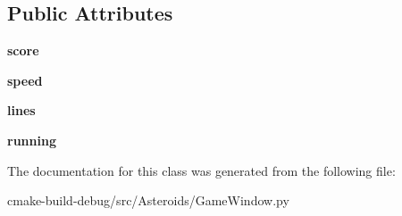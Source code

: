 \subsection*{Public Attributes}
\begin{DoxyCompactItemize}
\item 
{\bfseries score}\hypertarget{classGameWindow_1_1GameWindow_a1d84d147b6e32a9b135ebd2c25fa9de2}{}\label{classGameWindow_1_1GameWindow_a1d84d147b6e32a9b135ebd2c25fa9de2}

\item 
{\bfseries speed}\hypertarget{classGameWindow_1_1GameWindow_a65e5c68dfa1017d7d36c127dc91f7800}{}\label{classGameWindow_1_1GameWindow_a65e5c68dfa1017d7d36c127dc91f7800}

\item 
{\bfseries lines}\hypertarget{classGameWindow_1_1GameWindow_a5596975989f8091d3e6424c80eff1559}{}\label{classGameWindow_1_1GameWindow_a5596975989f8091d3e6424c80eff1559}

\item 
{\bfseries running}\hypertarget{classGameWindow_1_1GameWindow_a75c82f26a471a2bce7c30cc1ce450e85}{}\label{classGameWindow_1_1GameWindow_a75c82f26a471a2bce7c30cc1ce450e85}

\end{DoxyCompactItemize}


The documentation for this class was generated from the following file\+:\begin{DoxyCompactItemize}
\item 
cmake-\/build-\/debug/src/\+Asteroids/Game\+Window.\+py\end{DoxyCompactItemize}
